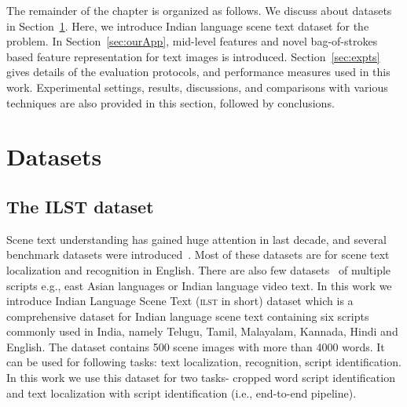 The remainder of the chapter is organized as follows. 
We discuss about datasets in Section~\ref{sec:datasets}. Here,
we introduce Indian language scene text dataset for the problem.
In Section~\ref{sec:ourApp}, mid-level features and novel bag-of-strokes based feature representation for text images is introduced. Section~\ref{sec:expts} gives details of the evaluation protocols, and performance measures used in this work. Experimental settings, results, discussions, and comparisons with various techniques are also provided  in this section, followed by conclusions.

\section{Datasets}
\label{sec:datasets}
\subsection{The ILST dataset}
Scene text understanding has gained huge attention in last decade, and several benchmark datasets were introduced~\cite{ICDARcomp11, MishraBMVC12}.
Most of these datasets are for scene text localization and recognition in English. There are also few datasets~\cite{SIWIcdar,CVSIComp} of multiple scripts e.g., east Asian languages or Indian language video text. In this work we introduce Indian Language Scene Text (\textsc{ilst} in short) dataset which is a comprehensive dataset for Indian language scene text containing six scripts commonly used in India, namely Telugu, Tamil, Malayalam, Kannada, Hindi and English. The dataset contains 500 scene images with more than 4000 words. It can be used for following tasks: text localization, recognition, script identification. In this work we use this dataset for two tasks- cropped word script identification and text localization with script identification (i.e., end-to-end pipeline).
\\
\

